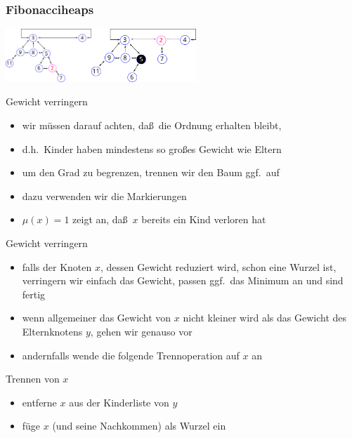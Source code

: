 \documentclass[aspectratio=1610, 11pt]{beamer}
\newcommand{\mytitle}{Fibonacciheaps}
\begin{document}
\begin{frame}\frametitle{\mytitle}
		\includegraphics[height=20mm]{images/fibo9.pdf}\hfill \includegraphics[height=20mm]{images/fibo11.pdf}
	\begin{overprint}
		\begin{exampleblock}{Gewicht verringern}
			\begin{itemize}
				\item wir m\"ussen darauf achten, da\ss\ die Ordnung erhalten bleibt,
				\item d.h.\ Kinder haben mindestens so gro\ss es Gewicht wie Eltern
				\item um den Grad zu begrenzen, trennen wir den Baum ggf.\ auf
				\item dazu verwenden wir die Markierungen
				\item $\mu(x)=1$ zeigt an, da\ss\ $x$ bereits ein Kind verloren hat
			\end{itemize}
		\end{exampleblock}	
		\begin{exampleblock}{Gewicht verringern}
			\begin{itemize}
				\item falls der Knoten $x$, dessen Gewicht reduziert wird, schon eine Wurzel ist, verringern wir einfach das Gewicht, passen ggf.\ das Minimum an und sind fertig
				\item wenn allgemeiner das Gewicht von $x$ nicht kleiner wird als das Gewicht des Elternknotens $y$, gehen wir genauso vor
				\item andernfalls wende die folgende Trennoperation auf $x$ an
			\end{itemize}
		\end{exampleblock}	
		\begin{exampleblock}{Trennen von $x$}
			\begin{itemize}
				\item entferne $x$ aus der Kinderliste von $y$
				\item f\"uge $x$ (und seine Nachkommen) als Wurzel ein

\end{itemize}
\end{exampleblock}
\end{overprint}
\end{frame}
\end{document}
